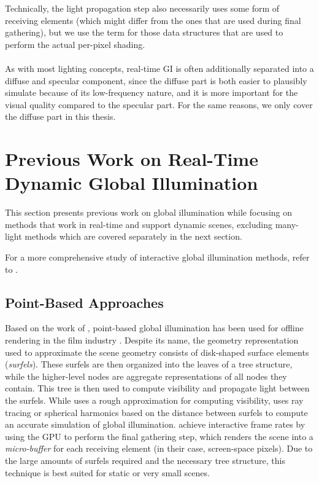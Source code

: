 Technically, the light propagation step also necessarily uses some form of receiving elements (which might differ from the ones that are used during final gathering), but we use the term for those data structures that are used to perform the actual per-pixel shading.
\\
\\
As with most lighting concepts, real-time GI is often additionally separated into a diffuse and specular component, since the diffuse part is both easier to plausibly simulate because of its low-frequency nature, and it is more important for the visual quality compared to the specular part. For the same reasons, we only cover the diffuse part in this thesis.



\section{Previous Work on Real-Time Dynamic Global Illumination}

This section presents previous work on global illumination while focusing on methods that work in real-time and support dynamic scenes, excluding many-light methods which are covered separately in the next section.

For a more comprehensive study of interactive global illumination methods, refer to \citet{Ritschel:2012:GISTAR}.

\subsection{Point-Based Approaches}

Based on the work of \citet{Bunnell:2005:AO}, point-based global illumination has been used for offline rendering in the film industry \citep{christensen2008point}.
Despite its name, the geometry representation used to approximate the scene geometry consists of disk-shaped surface elements (\emph{surfels}).
These surfels are then organized into the leaves of a tree structure, while the higher-level nodes are aggregate representations of all nodes they contain.
This tree is then used to compute visibility and propagate light between the surfels.
While \citet{Bunnell:2005:AO} uses a rough approximation for computing visibility, \citet{christensen2008point} uses ray tracing or spherical harmonics based on the distance between surfels to compute an accurate simulation of global illumination.
\citet{Ritschel:2009:microrendering} achieve interactive frame rates by using the GPU to perform the final gathering step, which renders the scene into a \emph{micro-buffer} for each receiving element (in their case, screen-space pixels).
Due to the large amounts of surfels required and the necessary tree structure, this technique is best suited for static or very small scenes.



